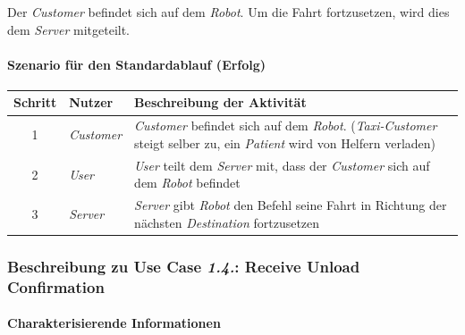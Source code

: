 				Der \emph{Customer} befindet sich auf dem \emph{Robot}. Um die Fahrt fortzusetzen, wird dies dem \emph{Server} mitgeteilt.
					\paragraph*{Szenario für den Standardablauf (Erfolg)}

				\begin{table}[H]
					\centering
					\begin{tabularx}{\textwidth}{|c|p{2cm}|X|}
					\hline
					Schritt & Nutzer & Beschreibung der Aktivität \\ \hline
					1 & \emph{Customer} & \emph{Customer} befindet sich auf dem \emph{Robot}. (\emph{Taxi-Customer} steigt selber zu, ein \emph{Patient} wird von Helfern verladen) \\
					2 & \emph{User} & \emph{User} teilt dem \emph{Server} mit, dass der \emph{Customer} sich auf dem \emph{Robot} befindet \\
					3 & \emph{Server} & \emph{Server} gibt \emph{Robot} den Befehl seine Fahrt in Richtung der nächsten \emph{Destination} fortzusetzen \\
					\hline
					\end{tabularx}
				\end{table}




			\subsubsection{Beschreibung zu Use Case \emph{1.4.}: Receive Unload Confirmation}
				\paragraph*{Charakterisierende Informationen}

